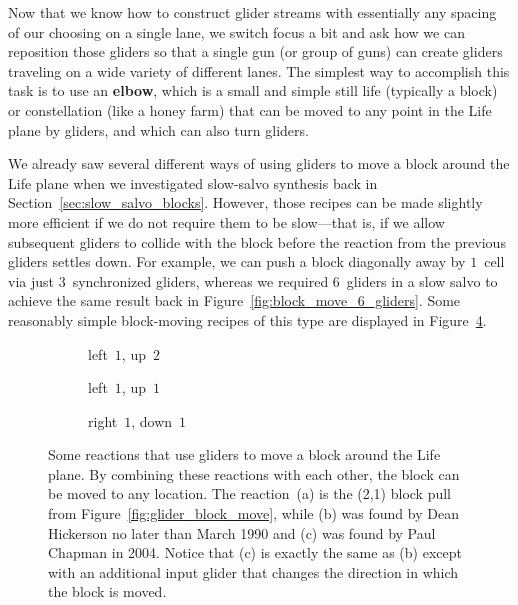 Now that we know how to construct glider streams with essentially any spacing of our choosing on a single lane, we switch focus a bit and ask how we can reposition those gliders so that a single gun (or group of guns) can create gliders traveling on a wide variety of different lanes. The simplest way to accomplish this task is to use an \textbf{elbow}, which is a small and simple still life (typically a block) or constellation (like a honey farm) that can be moved to any point in the Life plane by gliders, and which can also turn gliders.

We already saw several different ways of using gliders to move a block around the Life plane when we investigated slow-salvo synthesis back in Section~\ref{sec:slow_salvo_blocks}. However, those recipes can be made slightly more efficient if we do not require them to be slow---that is, if we allow subsequent gliders to collide with the block before the reaction from the previous gliders settles down. For example, we can push a block diagonally away by $1$~cell via just $3$~synchronized gliders, whereas we required $6$~gliders in a slow salvo to achieve the same result back in Figure~\ref{fig:block_move_6_gliders}. Some reasonably simple block-moving recipes of this type are displayed in Figure~\ref{fig:synchronized_block_movers}.

\begin{figure}[!htb]
	\centering
	\begin{subfigure}{0.3\textwidth}
		\centering
		\caption{left~$1$, up~$2$}
		\label{fig:synchronized_block_mover_1}
	\end{subfigure} \hfill \begin{subfigure}{.325\textwidth}
		\centering
					\caption{left~$1$, up~$1$}
		\label{fig:synchronized_block_mover_4}
	\end{subfigure} \hfill \begin{subfigure}{.325\textwidth}
		\centering
		\caption{right~$1$, down~$1$}
		\label{fig:synchronized_block_mover_5}
	\end{subfigure}
	\caption{Some reactions that use gliders to move a block around the Life plane. By combining these reactions with each other, the block can be moved to any location. The reaction~(a) is the (2,1) block pull from Figure~\ref{fig:glider_block_move}, while (b) was found by Dean Hickerson no later than March 1990 and (c) was found by Paul Chapman in 2004. Notice that (c) is exactly the same as (b) except with an additional input glider that changes the direction in which the block is moved.}\label{fig:synchronized_block_movers}
\end{figure}

